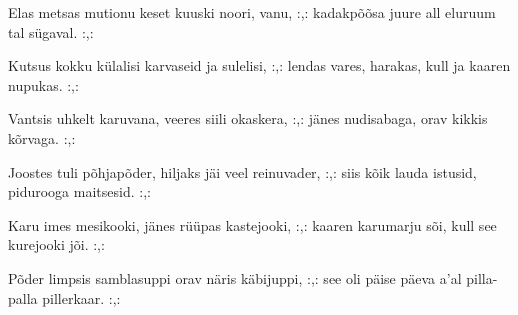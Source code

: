 Elas metsas mutionu
keset kuuski noori, vanu,
:,: kadakp\~o\~osa juure all
eluruum tal s\"ugaval. :,:

Kutsus kokku k\"ulalisi
karvaseid ja sulelisi,
:,: lendas vares, harakas,
kull ja kaaren nupukas. :,:

Vantsis uhkelt karuvana,
veeres siili okaskera,
:,: j\"anes nudisabaga,
orav kikkis k\~orvaga. :,:

Joostes tuli p\~ohjap\~oder,
hiljaks j\"ai veel reinuvader,
:,: siis k\~oik lauda istusid,
pidurooga maitsesid. :,:

Karu imes mesikooki,
j\"anes r\"u\"upas kastejooki,
:,: kaaren karumarju s\~oi,
kull see kurejooki j\~oi. :,:

P\~oder limpsis samblasuppi
orav n\"aris k\"abijuppi,
:,: see oli p\"aise p\"aeva a'al
pilla-palla pillerkaar. :,: